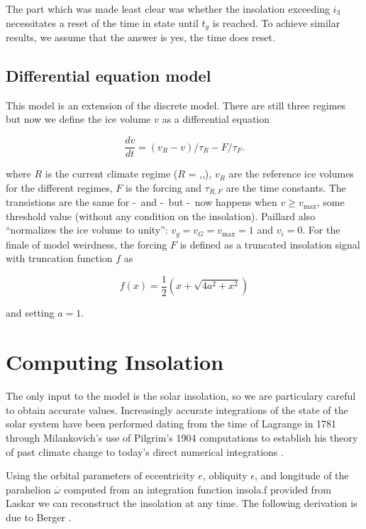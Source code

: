 The part which was made least clear was whether the insolation exceeding $i_3$ necessitates a reset of the time in state \mild until $t_g$ is reached.
To achieve similar results, we assume that the answer is yes, the time does reset.



\subsection{Differential equation model}


This model is an extension of the discrete model.
There are still three regimes but now we define the ice volume $v$ as a differential equation

$$ \frac{dv}{dt} = (v_R - v) /\tau _R - F/\tau _F .$$

where $R$ is the current climate regime ($R$ = \inter,\mild,\full), $v_R$ are the reference ice volumes for the different regimes, $F$ is the forcing and $\tau _{R,F}$ are the time constants.
The transistions are the same for \inter-\mild~and \full-\mild~but \mild-\full~now happens when $v \geq v_\text{max}$, some threshold value (without any condition on the insolation).
Paillard also ``normalizes the ice volume to unity'': $v_g = v_G = v_\text{max} = 1$ and $v_i = 0$.
For the finale of model weirdness, the forcing $F$ is defined as a truncated insolation signal with truncation function $f$ as

$$ f(x) = \frac{1}{2} \left ( x + \sqrt{4a^2 + x^2} \right ) $$

and setting $a=1$.

\section{Computing Insolation}

The only input to the model is the solar insolation, so we are particulary careful to obtain accurate values.
Increasingly accurate integrations of the state of the solar system have been performed dating from the time of Lagrange in 1781 through Milankovich's use of Pilgrim's 1904 computations to establish his theory of past climate change to today's direct numerical integrations \cite{laskar2004long}.

Using the orbital parameters of eccentricity $e$, obliquity $\epsilon$, and longitude of the parahelion $\overline{\omega}$ computed from an integration function insola.f provided from Laskar \cite{laskar2004long} we can reconstruct the insolation at any time.
The following derivation is due to Berger \cite{berger1981long}.

